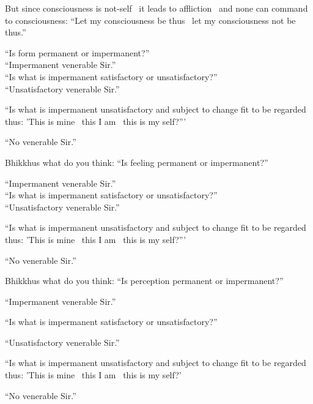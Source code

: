 \begin{english-only-hang}
But since consciousness is not-self \breathmark\ it leads to affliction \breathmark\ and none can command to consciousness: ``Let my consciousness be thus \breathmark\ let my consciousness not be thus.''
\end{english-only-hang}
\begin{english-only-nohang}
 ``Is form permanent or impermanent?''\\

``Impermanent venerable Sir.''\\

``Is what is impermanent satisfactory or unsatisfactory?''\\

``Unsatisfactory venerable Sir.''\\

\begin{english-hangtogether}
``Is what is impermanent unsatisfactory and subject to change fit to be regarded thus: 'This is mine \breathmark\ this I am \breathmark\ this is my self?'''
\end{english-hangtogether}

``No venerable Sir.''
\end{english-only-nohang}

\begin{english-only-nohang}
Bhikkhus what do you think: ``Is feeling permanent or impermanent?''

``Impermanent venerable Sir.''\\

``Is what is impermanent satisfactory or unsatisfactory?''\\

``Unsatisfactory venerable Sir.''\\

\begin{english-hangtogether}
``Is what is impermanent unsatisfactory and subject to change fit to be regarded thus: 'This is mine \breathmark\ this I am \breathmark\ this is my self?'''
\end{english-hangtogether}

``No venerable Sir.''
\end{english-only-nohang}

\begin{english-only-nohang}
Bhikkhus what do you think: ``Is perception permanent or impermanent?''

``Impermanent venerable Sir.''

``Is what is impermanent satisfactory or unsatisfactory?''

``Unsatisfactory venerable Sir.''

\begin{english-hangtogether}
``Is what is impermanent unsatisfactory and subject to change fit to be regarded thus: 'This is mine \breathmark\ this I am \breathmark\ this is my self?'
\end{english-hangtogether}

``No venerable Sir.''
\end{english-only-nohang}

